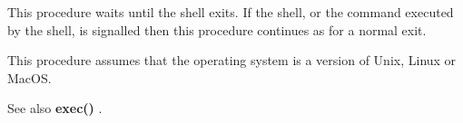         This procedure waits until the shell exits. If the shell, or the command
        executed by the shell, is signalled then this procedure continues as for
        a normal exit.
        
        This procedure assumes that the operating system is a version of
        Unix, Linux or MacOS.

        See also {\bf exec()} .



%        
%        
%        
%        
%        


